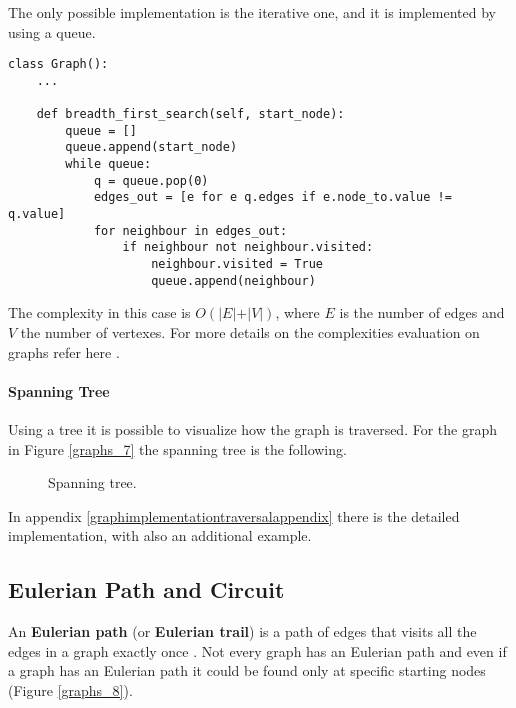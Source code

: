 The only possible implementation is the iterative one, and it is implemented by using a queue.

\begin{lstlisting}[firstnumber=1, caption={Recursive implementation of a depth-first search.}]
class Graph():
	...
	
	def breadth_first_search(self, start_node):
  		queue = []
		queue.append(start_node)
  		while queue:
    		q = queue.pop(0)
    		edges_out = [e for e q.edges if e.node_to.value != q.value]
    		for neighbour in edges_out:
      			if neighbour not neighbour.visited:
        			neighbour.visited = True
        			queue.append(neighbour)
\end{lstlisting}

The complexity in this case is \(O(\vert E \vert + \vert V \vert)\), where \(E\) is the number of edges and \(V\) the number of vertexes. For more details on the complexities evaluation on graphs refer here \cite{goodrich2013data}.

\paragraph{Spanning Tree}
Using a tree it is possible to visualize how the graph is traversed. For the graph in Figure \ref{graphs_7} the spanning tree is the following.

\begin{figure}[H]
\centering
{}  
\caption[Spanning tree.]{Spanning tree.}
\label{graphs_spanning_tree}
\end{figure}

In appendix \ref{graphimplementationtraversalappendix} there is the detailed implementation, with also an additional example.
\subsection{Eulerian Path and Circuit}
An \textbf{Eulerian path} (or \textbf{Eulerian trail}) is a path of edges that visits all the edges in a graph exactly once \cite{wikieulerianpathcircuit}. Not every graph has an Eulerian path and even if a graph has an Eulerian path it could be found only at specific starting nodes (Figure \ref{graphs_8}).

